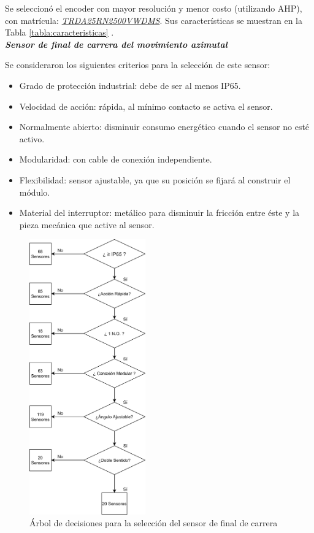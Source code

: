 Se seleccionó el encoder con mayor resolución y menor costo (utilizando AHP), con matrícula: \underline{\textit{TRDA25RN2500VWDMS}}. Sus características se muestran en la Tabla \ref{tabla:caracteristicas} \cite{DDA6}.\\

\textbf{\textit{Sensor de final de carrera del movimiento azimutal}}

Se consideraron los siguientes criterios para la selección de este sensor:
\begin{itemize}
	\item Grado de protección industrial: debe de ser al menos IP65.
	\item Velocidad de acción: rápida, al mínimo contacto se activa el sensor.
	\item Normalmente abierto: disminuir consumo energético cuando el sensor no esté activo.
	\item Modularidad: con cable de conexión independiente.
	\item Flexibilidad: sensor ajustable, ya que su posición se fijará al construir el módulo.
	\item Material del interruptor: metálico para disminuir la fricción entre éste y la pieza mecánica que active al sensor.
\end{itemize}

\begin{figure}[H]
	\centering
	\includegraphics[width=5cm]{imagenes/limit1}
	\caption{Árbol de decisiones para la selección del sensor de final de carrera}
	\label{fig:limitZ}
\end{figure}

